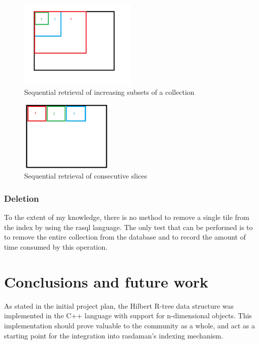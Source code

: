 \documentclass[11pt, a4paper, oneside]{article}
\begin{document}
\begin{figure}[h!]
  \centering
    \includegraphics[width=0.5\textwidth]{img/search1}
      \caption{Sequential retrieval of increasing subsets of a collection}
  \label{fig:search1}
\end{figure}

\begin{figure}[h!]
  \centering
    \includegraphics[width=0.4\textwidth]{img/search2}
      \caption{Sequential retrieval of consecutive slices}
  \label{fig:search2}
\end{figure}

\subsubsection*{Deletion}
To the extent of my knowledge, there is no method to remove a single tile from the index by using the rasql language. The only test that can be performed is to to remove the entire collection from the database and to record the amount of time consumed by this operation.

\section{Conclusions and future work}
\label{sec:conclusions}
As stated in the initial project plan, the Hilbert R-tree data structure was implemented in the C++ language with support for n-dimensional objects. This implementation should prove valuable to the community as a whole, and act as a starting point for the integration into rasdaman's indexing mechanism.
\end{document}
